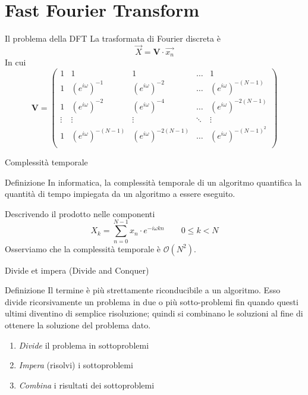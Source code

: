 \documentclass[10pt, xetex]{beamer}
\begin{document}
\section{Fast Fourier Transform}
\begin{frame}{Il problema della DFT}
    La trasformata di Fourier discreta \`e
    \[
        \vec{X} = \mathbf{V}\cdot\vec{x_n}
    \]
    In cui
    \[
        \mathbf{V} = 
        \begin{pmatrix}
        1      & 1                      & 1                       & \dots  & 1                        \\[1em]
        1      & (e^{i\omega})^{-1}     & (e^{i\omega})^{-2}      & \dots  & (e^{i\omega})^{-(N-1)}   \\[1em]
        1      & (e^{i\omega})^{-2}     & (e^{i\omega})^{-4}      & \dots  & (e^{i\omega})^{-2(N-1)}  \\[1em]
        \vdots & \vdots                 &  \vdots                 & \ddots & \vdots                   \\[1em]
        1      & (e^{i\omega})^{-(N-1)} & (e^{i\omega})^{-2(N-1)} & \dots  & (e^{i\omega})^{-(N-1)^2} \\[1em]
        \end{pmatrix}
    \]
\end{frame}


\begin{frame}{Complessit\`a temporale}
    \begin{block}{Definizione}
        In informatica, la complessità temporale di un algoritmo quantifica la
        quantità di tempo impiegata da un algoritmo a essere eseguito.
    \end{block}
    Descrivendo il prodotto nelle componenti
    \[
        X_k = \sum_{n=0}^{N-1} x_n\cdot e^{-i\omega kn}
        \qquad 0 \leq k < N
    \]
    Osserviamo che la complessit\`a temporale \`e \(\mathcal{O}(N^2)\).
\end{frame}

\begin{frame}{Divide et impera (Divide and Conquer)}
    \begin{block}{Definizione}
        Il termine è più strettamente riconducibile a un algoritmo. Esso
        divide ricorsivamente un problema in due o più sotto-problemi fin
        quando questi ultimi diventino di semplice risoluzione; quindi si
        combinano le soluzioni al fine di ottenere la soluzione del problema
        dato. 
    \end{block}
    \begin{enumerate}
        \item \emph{Divide} il problema in sottoproblemi
        \item \emph{Impera} (risolvi) i sottoproblemi
        \item \emph{Combina} i risultati dei sottoproblemi
    \end{enumerate}
\end{frame}
\end{document}

